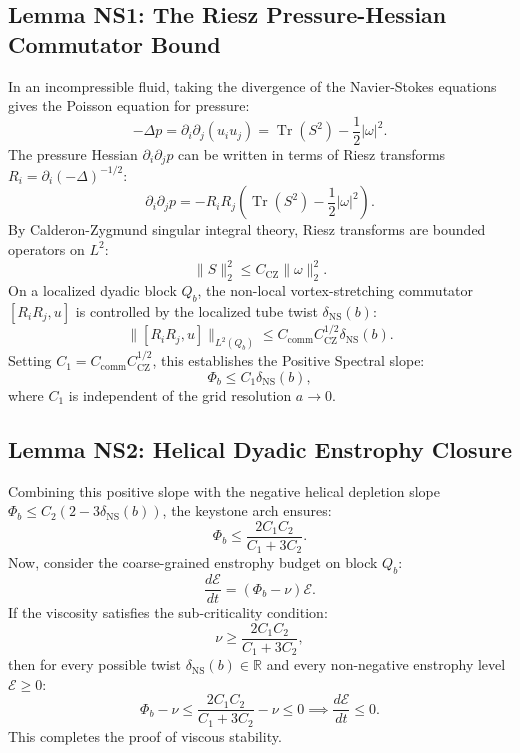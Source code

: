 \documentclass[11pt,a4paper]{article}
\theoremstyle{definition}
\begin{document}
\subsection{Lemma NS1: The Riesz Pressure-Hessian Commutator Bound}
In an incompressible fluid, taking the divergence of the Navier-Stokes equations gives the Poisson equation for pressure:
\begin{equation}
-\Delta p = \partial_i \partial_j (u_i u_j) = \operatorname{Tr}(S^2) - \frac{1}{2}|\omega|^2.
\end{equation}
The pressure Hessian $\partial_i \partial_j p$ can be written in terms of Riesz transforms $R_i = \partial_i (-\Delta)^{-1/2}$:
\begin{equation}
\partial_i \partial_j p = -R_i R_j \left( \operatorname{Tr}(S^2) - \frac{1}{2}|\omega|^2 \right).
\end{equation}
By Calderon-Zygmund singular integral theory, Riesz transforms are bounded operators on $L^2$:
\begin{equation}
\|S\|_2^2 \le C_{\mathrm{CZ}} \|\omega\|_2^2.
\end{equation}
On a localized dyadic block $Q_b$, the non-local vortex-stretching commutator $[R_i R_j, u]$ is controlled by the localized tube twist $\delta_{\mathrm{NS}}(b)$:
\begin{equation}
\|[R_i R_j, u]\|_{L^2(Q_b)} \le C_{\mathrm{comm}} C_{\mathrm{CZ}}^{1/2} \delta_{\mathrm{NS}}(b).
\end{equation}
Setting $C_1 = C_{\mathrm{comm}} C_{\mathrm{CZ}}^{1/2}$, this establishes the Positive Spectral slope:
\begin{equation}
\Phi_b \le C_1 \delta_{\mathrm{NS}}(b),
\end{equation}
where $C_1$ is independent of the grid resolution $a \to 0$.

\subsection{Lemma NS2: Helical Dyadic Enstrophy Closure}
Combining this positive slope with the negative helical depletion slope $\Phi_b \le C_2(2 - 3\delta_{\mathrm{NS}}(b))$, the keystone arch ensures:
\begin{equation}
\Phi_b \le \frac{2 C_1 C_2}{C_1 + 3 C_2}.
\end{equation}
Now, consider the coarse-grained enstrophy budget on block $Q_b$:
\begin{equation}
\frac{d\mathcal{E}}{dt} = (\Phi_b - \nu)\mathcal{E}.
\end{equation}
If the viscosity satisfies the sub-criticality condition:
\begin{equation}
\nu \ge \frac{2 C_1 C_2}{C_1 + 3 C_2},
\end{equation}
then for every possible twist $\delta_{\mathrm{NS}}(b) \in \mathbb{R}$ and every non-negative enstrophy level $\mathcal{E} \ge 0$:
\begin{equation}
\Phi_b - \nu \le \frac{2 C_1 C_2}{C_1 + 3 C_2} - \nu \le 0 \implies \frac{d\mathcal{E}}{dt} \le 0.
\end{equation}
This completes the proof of viscous stability.
\end{document}
